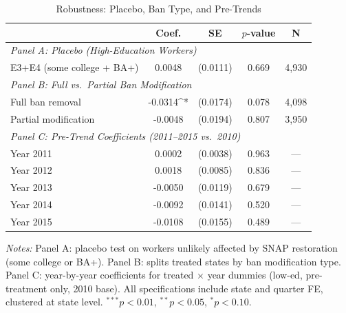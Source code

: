 \begin{table}[htbp]
\centering
\caption{Robustness: Placebo, Ban Type, and Pre-Trends}
\label{tab:robustness}
\begin{tabular}{lcccc}
\toprule
 & Coef. & SE & $p$-value & N \\
\midrule
\multicolumn{5}{l}{\textit{Panel A: Placebo (High-Education Workers)}} \\
\quad E3+E4 (some college + BA+) & 0.0048 & (0.0111) & 0.669 & 4,930 \\
[0.5em]
\multicolumn{5}{l}{\textit{Panel B: Full vs.~Partial Ban Modification}} \\
\quad Full ban removal & -0.0314^{*} & (0.0174) & 0.078 & 4,098 \\
\quad Partial modification & -0.0048 & (0.0194) & 0.807 & 3,950 \\
[0.5em]
\multicolumn{5}{l}{\textit{Panel C: Pre-Trend Coefficients (2011--2015 vs.~2010)}} \\
\quad Year 2011 & 0.0002 & (0.0038) & 0.963 & --- \\
\quad Year 2012 & 0.0018 & (0.0085) & 0.836 & --- \\
\quad Year 2013 & -0.0050 & (0.0119) & 0.679 & --- \\
\quad Year 2014 & -0.0092 & (0.0141) & 0.520 & --- \\
\quad Year 2015 & -0.0108 & (0.0155) & 0.489 & --- \\
\bottomrule
\end{tabular}
\par\vspace{0.3em}
{\footnotesize \textit{Notes:} Panel A: placebo test on workers unlikely affected by SNAP restoration (some college or BA+). Panel B: splits treated states by ban modification type. Panel C: year-by-year coefficients for treated $\times$ year dummies (low-ed, pre-treatment only, 2010 base). All specifications include state and quarter FE, clustered at state level. $^{***}p<0.01$, $^{**}p<0.05$, $^{*}p<0.10$.}
\end{table}
